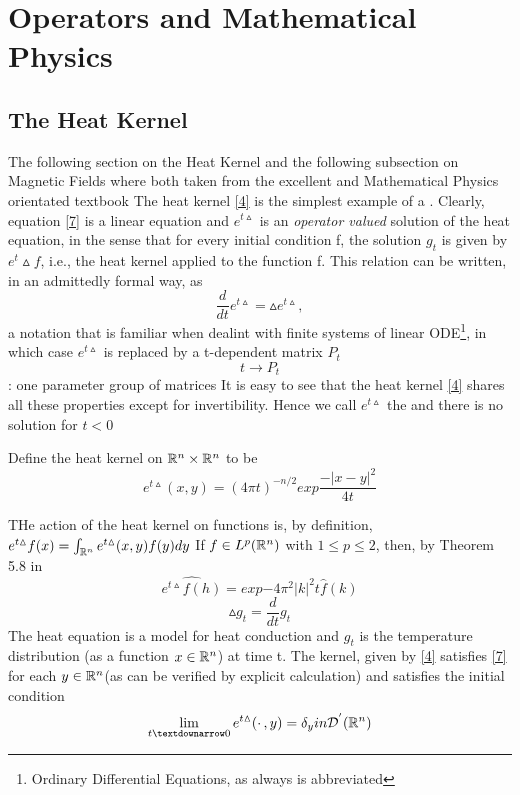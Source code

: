 \section{Operators and Mathematical Physics}
\subsection{The Heat Kernel}
The following section on the Heat Kernel and the following subsection on Magnetic Fields where both taken from the excellent
and Mathematical Physics orientated textbook\cite{lieb2001analysis}
The heat kernel \ref{4} is the simplest example of a . Clearly, equation \ref{7} 
is a linear equation and $e^{t\vartriangle}$ is an \textit{operator valued} solution of the heat equation, in the sense that for every 
initial condition f, the solution $g_t$ is given by $e^t\vartriangle f$, i.e., the heat kernel applied to the function f.
This relation can be written, in an admittedly formal way, as
\begin{equation}
 \frac{d}{dt} e^{t \vartriangle} = \vartriangle e^{t \vartriangle},
\end{equation}
a notation that is familiar when dealint with finite systems of linear ODE\footnote{Ordinary Differential Equations, as always
is abbreviated}, in which case $e^{t \vartriangle}$ is replaced by a t-dependent matrix $P_t$
$$t \rightarrow P_t$$: one parameter group of matrices
  It is easy to see that the heat kernel \ref{4} shares all these properties except for invertibility.
    Hence we call $e^{t \vartriangle}$ the  and there is no solution for $t \lt 0$
\begin{dfn}
 Define the heat kernel on $\mathbb{R}^n \times \mathbb{R}^n$ to be 
\begin{equation}\label{4}
 e^{t \vartriangle}(x,y) = (4\pi t)^{-n/2} exp{\frac{-|x-y|^2}{4t}}
\end{equation}

\end{dfn}
THe action of the heat kernel on functions is, by definition, 
$e^{t \vartriangle}f(x) = \int_{\mathbb{R}^n}e^{t \vartriangle}(x,y)f(y)dy$
If $f \in L^{p}(\mathbb{R}^n)$ with $1\leq p \leq 2$, then, by Theorem 5.8 in \cite{lieb2001analysis}
\begin{equation}
 \hat{e^{t \vartriangle}f(h)}= exp{-4\pi^2|k|^2 t}\hat{f}(k)
\end{equation}
\begin{equation}\label{7}
 \vartriangle g_t = \frac{d}{dt}g_t
\end{equation}
The heat equation is a model for heat conduction and $g_t$ is the temperature distribution (as a function $x \in \mathbb{R}^n$)
at time t. The kernel, given by \ref{4} satisfies \ref{7} for each $y \in \mathbb{R}^n$(as can be verified by 
explicit calculation) and satisfies the initial condition
\begin{equation}
 \lim_{t\textdownarrow 0} e^{t \vartriangle}(\cdotp,y) = \delta_y in \mathcal{D}^{'}(\Rbb^n)
\end{equation}
